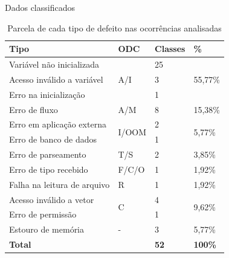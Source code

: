\documentclass[brazilian]{beamer}
\begin{document}
\begin{frame}{Dados classificados}
    \begin{table}[H]
        \centering
        \begin{tabularx}{\linewidth}{ l|l|l|l }
            \textbf{Tipo} & \textbf{ODC} & \textbf{Classes} & \textbf{\%} \\
            \hline
            Variável não inicializada & \multirow{3}{*}{ A/I } & 25 & \multirow{3}{*}{ 55,77\% } \\
            Acesso inválido a variável & & 3 & \\
            Erro na inicialização & & 1 & \\
            \hline
            Erro de fluxo & A/M & 8 & 15,38\% \\
            \hline
            Erro em aplicação externa & \multirow{2}{*}{I/OOM} & 2 & \multirow{2}{*}{5,77\%} \\
            Erro de banco de dados & & 1 \\
            \hline
            Erro de parseamento & T/S & 2 & 3,85\% \\
            \hline
            Erro de tipo recebido & F/C/O & 1 & 1,92\% \\
            \hline
            Falha na leitura de arquivo & R & 1 & 1,92\% \\
            \hline
            Acesso inválido a vetor & \multirow{2}{*}{C} & 4 & \multirow{2}{*}{9,62\%} \\
            Erro de permissão & & 1 & \\
            \hline
            Estouro de memória & - & 3 & 5,77\% \\
            \hline
            \multicolumn{2}{l|}{\textbf{Total}} & \textbf{52} & \textbf{100\%} \\
        \end{tabularx}
        \caption{Parcela de cada tipo de defeito nas ocorrências analisadas}
        \label{table:our_results_classified_by_odc}
    \end{table}
\end{frame}
\end{document}
